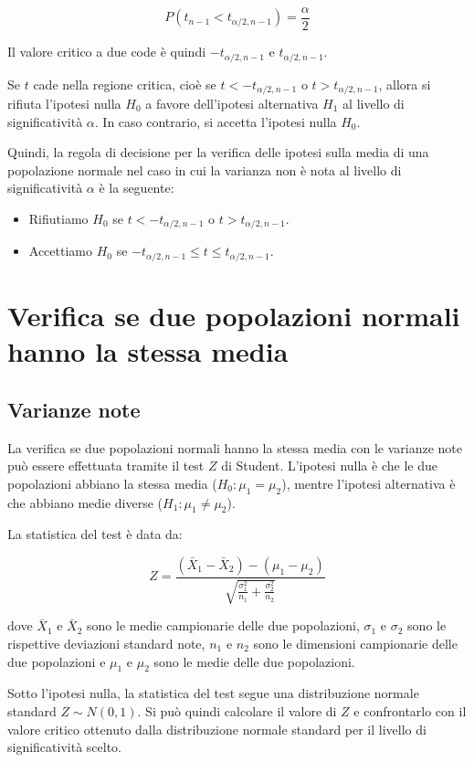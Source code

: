 $$
P(t_{n-1} < t_{\alpha/2,n-1}) = \frac{\alpha}{2}
$$

Il valore critico a due code è quindi $-t_{\alpha/2,n-1}$ e $t_{\alpha/2,n-1}$.

Se $t$ cade nella regione critica, cioè se $t < -t_{\alpha/2,n-1}$ o $t > t_{\alpha/2,n-1}$, allora si rifiuta l'ipotesi nulla $H_0$ a favore dell'ipotesi alternativa $H_1$ al livello di significatività $\alpha$. In caso contrario, si accetta l'ipotesi nulla $H_0$.

Quindi, la regola di decisione per la verifica delle ipotesi sulla media di una popolazione normale nel caso in cui la varianza non è nota al livello di significatività $\alpha$ è la seguente:
\begin{itemize}
  
\item Rifiutiamo $H_0$ se $t < -t_{\alpha/2,n-1}$ o $t > t_{\alpha/2,n-1}$.
\item Accettiamo $H_0$ se $-t_{\alpha/2,n-1} \leq t \leq t_{\alpha/2,n-1}$.

\end{itemize}


\section{Verifica se due popolazioni normali hanno la stessa media}

\subsection{Varianze note}
La verifica se due popolazioni normali hanno la stessa media con le varianze note può essere effettuata tramite il test $Z$ di Student. L'ipotesi nulla è che le due popolazioni abbiano la stessa media ($H_0: \mu_1 = \mu_2$), mentre l'ipotesi alternativa è che abbiano medie diverse ($H_1: \mu_1 \neq \mu_2$).

La statistica del test è data da:

$$Z = \frac{(\bar{X}_1 - \bar{X}_2) - (\mu_1 - \mu_2)}{\sqrt{\frac{\sigma_1^2}{n_1} + \frac{\sigma_2^2}{n_2}}}$$

dove $\bar{X}_1$ e $\bar{X}_2$ sono le medie campionarie delle due popolazioni, $\sigma_1$ e $\sigma_2$ sono le rispettive deviazioni standard note, $n_1$ e $n_2$ sono le dimensioni campionarie delle due popolazioni e $\mu_1$ e $\mu_2$ sono le medie delle due popolazioni.

Sotto l'ipotesi nulla, la statistica del test segue una distribuzione normale standard $Z \sim N(0,1)$. Si può quindi calcolare il valore di $Z$ e confrontarlo con il valore critico ottenuto dalla distribuzione normale standard per il livello di significatività scelto.

